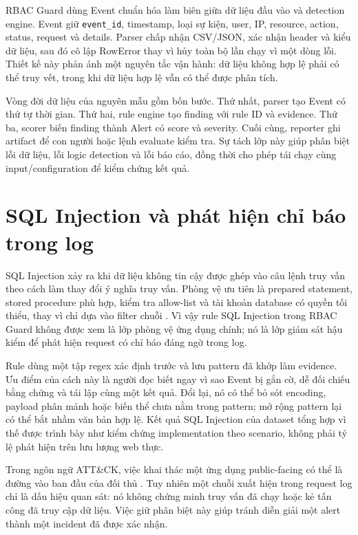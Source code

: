 RBAC Guard dùng Event chuẩn hóa làm biên giữa dữ liệu đầu vào và detection
engine. Event giữ \texttt{event\_id}, timestamp, loại sự kiện, user, IP,
resource, action, status, request và details. Parser chấp nhận CSV/JSON, xác
nhận header và kiểu dữ liệu, sau đó cô lập RowError thay vì hủy toàn bộ lần
chạy vì một dòng lỗi. Thiết kế này phản ánh một nguyên tắc vận hành: dữ liệu
không hợp lệ phải có thể truy vết, trong khi dữ liệu hợp lệ vẫn có thể được
phân tích.

Vòng đời dữ liệu của nguyên mẫu gồm bốn bước. Thứ nhất, parser tạo Event có
thứ tự thời gian. Thứ hai, rule engine tạo finding với rule ID và evidence.
Thứ ba, scorer biến finding thành Alert có score và severity. Cuối cùng,
reporter ghi artifact để con người hoặc lệnh evaluate kiểm tra. Sự tách lớp này
giúp phân biệt lỗi dữ liệu, lỗi logic detection và lỗi báo cáo, đồng thời cho
phép tái chạy cùng input/configuration để kiểm chứng kết quả.

\section{SQL Injection và phát hiện chỉ báo trong log}

SQL Injection xảy ra khi dữ liệu không tin cậy được ghép vào câu lệnh truy vấn
theo cách làm thay đổi ý nghĩa truy vấn. Phòng vệ ưu tiên là prepared statement,
stored procedure phù hợp, kiểm tra allow-list và tài khoản database có quyền
tối thiểu, thay vì chỉ dựa vào filter chuỗi \citep{OWASPSQLi}. Vì vậy rule SQL
Injection trong RBAC Guard không được xem là lớp phòng vệ ứng dụng chính; nó là
lớp giám sát hậu kiểm để phát hiện request có chỉ báo đáng ngờ trong log.

Rule dùng một tập regex xác định trước và lưu pattern đã khớp làm evidence.
Ưu điểm của cách này là người đọc biết ngay vì sao Event bị gắn cờ, dễ đối
chiếu bằng chứng và tái lập cùng một kết quả. Đổi lại, nó có thể bỏ sót
encoding, payload phân
mảnh hoặc biến thể chưa nằm trong pattern; mở rộng pattern lại có thể bắt nhầm
văn bản hợp lệ. Kết quả SQL Injection của dataset tổng hợp vì thế được trình
bày như kiểm chứng implementation theo scenario, không phải tỷ lệ phát hiện
trên lưu lượng web thực.

Trong ngôn ngữ ATT\&CK, việc khai thác một ứng dụng public-facing có thể là
đường vào ban đầu của đối thủ \citep{MITRET1190}. Tuy nhiên một chuỗi xuất hiện
trong request log chỉ là dấu hiệu quan sát: nó không chứng minh truy vấn đã chạy
hoặc kẻ tấn công đã truy cập dữ liệu. Việc giữ phân biệt này giúp tránh diễn giải
một alert thành một incident đã được xác nhận.

